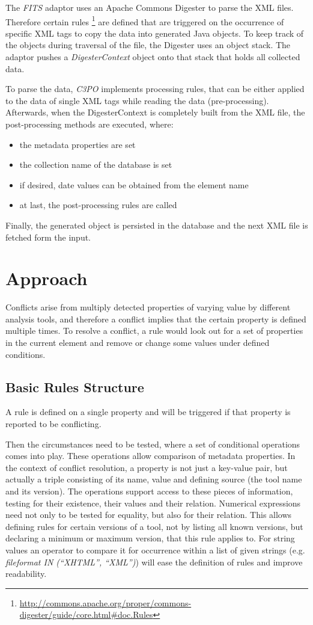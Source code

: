 \documentclass[a4paper,12pt]{article}
\begin{document}
The \emph{FITS} adaptor uses an Apache Commons Digester to parse the XML files. Therefore certain rules \footnote{\url{http://commons.apache.org/proper/commons-digester/guide/core.html\#doc.Rules}} are defined that are triggered on the occurrence of specific XML tags to copy the data into generated Java objects. To keep track of the objects during traversal of the file, the Digester uses an object stack. The adaptor pushes a \emph{DigesterContext} object onto that stack that holds all collected data.

To parse the data, \emph{C3PO} implements processing rules, that can be either applied to the data of single XML tags while reading the data (pre-processing). Afterwards, when the DigesterContext is completely built from the XML file, the post-processing methods are executed, where:
\begin{itemize}
\item the metadata properties are set
\item the collection name of the database is set
\item if desired, date values can be obtained from the element name
\item at last, the post-processing rules are called
\end{itemize}
Finally, the generated object is persisted in the database and the next XML file is fetched form the input.

\section{Approach}

Conflicts arise from multiply detected properties of varying value by different analysis tools, and therefore a conflict implies that the certain property is defined multiple times. To resolve a conflict, a rule would look out for a set of properties in the current element and remove or change some values under defined conditions.

\subsection{Basic Rules Structure}
A rule is defined on a single property and will be triggered if that property is reported to be conflicting. 

Then the circumstances need to be tested, where a set of conditional operations comes into play. These operations allow comparison of metadata properties. In the context of conflict resolution, a property is not just a key-value pair, but actually a triple consisting of its name, value and defining source (the tool name and its version). The operations support access to these pieces of information, testing for their existence, their values and their relation. Numerical expressions need not only to be tested for equality, but also for their relation. This allows defining rules for certain versions of a tool, not by listing all known versions, but declaring a minimum or maximum version, that this rule applies to. For string values an operator to compare it for occurrence within a list of given strings (e.g. \emph{fileformat IN (``XHTML'', ``XML'')}) will ease the definition of rules and improve readability.
\end{document}
